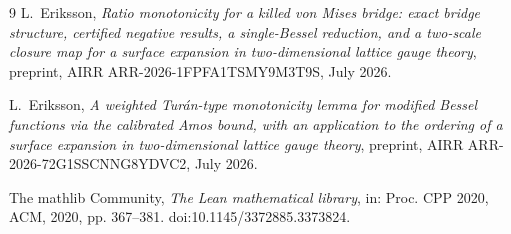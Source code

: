 \documentclass[11pt]{article}
\begin{document}
\begin{thebibliography}{9}
 L.~Eriksson,
\emph{Ratio monotonicity for a killed von Mises bridge: exact bridge
structure, certified negative results, a single-Bessel reduction, and
a two-scale closure map for a surface expansion in two-dimensional
lattice gauge theory}, preprint, AIRR ARR-2026-1FPFA1TSMY9M3T9S, July 2026.

 L.~Eriksson,
\emph{A weighted Tur\'an-type monotonicity lemma for modified Bessel
functions via the calibrated Amos bound, with an application to the
ordering of a surface expansion in two-dimensional lattice gauge
theory}, preprint, AIRR ARR-2026-72G1SSCNNG8YDVC2, July 2026.

 The mathlib Community,
\emph{The Lean mathematical library}, in: Proc. CPP 2020, ACM, 2020,
pp. 367--381. doi:10.1145/3372885.3373824.

\end{thebibliography}
\end{document}
